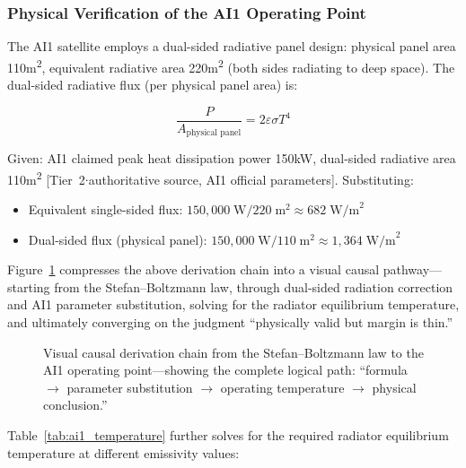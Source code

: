 \subsubsection{Physical Verification of the AI1 Operating Point}

The AI1 satellite employs a dual-sided radiative panel design: physical panel area 110\;m\textsuperscript{2}, equivalent radiative area 220\;m\textsuperscript{2} (both sides radiating to deep space). The dual-sided radiative flux (per physical panel area) is:

\begin{equation}
\frac{P}{A_{\text{physical panel}}} = 2\varepsilon\sigma T^{4}
\label{eq:sb_double}
\end{equation}

Given: AI1 claimed peak heat dissipation power 150\;kW, dual-sided radiative area 110\;m\textsuperscript{2} [Tier~2$\cdot$authoritative source, AI1 official parameters\cite{spacex2026ai1}]. Substituting:

\begin{itemize}[leftmargin=*]
    \item Equivalent single-sided flux: $150,000\;\text{W} / 220\;\text{m}^2 \approx 682\;\text{W/m}^2$
    \item Dual-sided flux (physical panel): $150,000\;\text{W} / 110\;\text{m}^2 \approx 1,364\;\text{W/m}^2$
\end{itemize}

Figure~\ref{fig:sb_causal_chain} compresses the above derivation chain into a visual causal pathway---starting from the Stefan--Boltzmann law, through dual-sided radiation correction and AI1 parameter substitution, solving for the radiator equilibrium temperature, and ultimately converging on the judgment ``physically valid but margin is thin.''

\begin{figure}[H]
\centering

\caption{Visual causal derivation chain from the Stefan--Boltzmann law to the AI1 operating point---showing the complete logical path: ``formula $\to$ parameter substitution $\to$ operating temperature $\to$ physical conclusion.''}
\label{fig:sb_causal_chain}
\end{figure}

Table~\ref{tab:ai1_temperature} further solves for the required radiator equilibrium temperature at different emissivity values:

